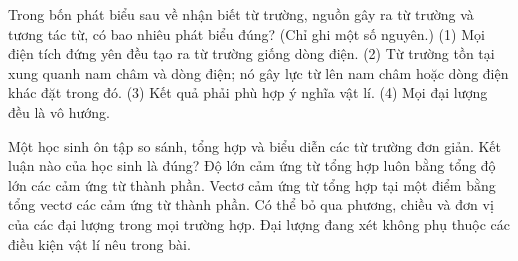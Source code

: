 \begin{ex}
Trong bốn phát biểu sau về nhận biết từ trường, nguồn gây ra từ trường và tương tác từ, có bao nhiêu phát biểu đúng? (Chỉ ghi một số nguyên.) (1) Mọi điện tích đứng yên đều tạo ra từ trường giống dòng điện. (2) Từ trường tồn tại xung quanh nam châm và dòng điện; nó gây lực từ lên nam châm hoặc dòng điện khác đặt trong đó. (3) Kết quả phải phù hợp ý nghĩa vật lí. (4) Mọi đại lượng đều là vô hướng.
\end{ex}

\begin{ex}
Một học sinh ôn tập so sánh, tổng hợp và biểu diễn các từ trường đơn giản. Kết luận nào của học sinh là đúng?
\choice
{Độ lớn cảm ứng từ tổng hợp luôn bằng tổng độ lớn các cảm ứng từ thành phần.}
{\True Vectơ cảm ứng từ tổng hợp tại một điểm bằng tổng vectơ các cảm ứng từ thành phần.}
{Có thể bỏ qua phương, chiều và đơn vị của các đại lượng trong mọi trường hợp.}
{Đại lượng đang xét không phụ thuộc các điều kiện vật lí nêu trong bài.}
\end{ex}


